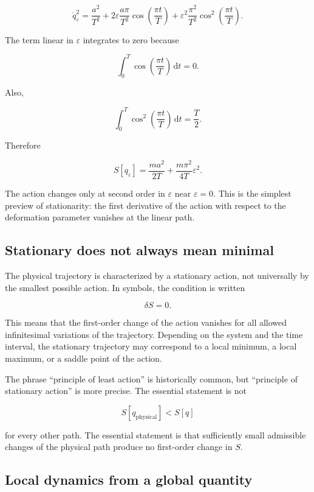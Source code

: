 \[
\dot q_{\varepsilon}^{2}
=
\frac{a^{2}}{T^{2}}
+
2\varepsilon\frac{a\pi}{T^{2}}
\cos\left(\frac{\pi t}{T}\right)
+
\varepsilon^{2}\frac{\pi^{2}}{T^{2}}
\cos^{2}\left(\frac{\pi t}{T}\right).
\]

The term linear in \(\varepsilon\) integrates to zero because

\[
\int_{0}^{T}
\cos\left(\frac{\pi t}{T}\right)
\,\mathrm{d}t
=
0.
\]

Also,

\[
\int_{0}^{T}
\cos^{2}\left(\frac{\pi t}{T}\right)
\,\mathrm{d}t
=
\frac{T}{2}.
\]

Therefore

\[
\boxed{
S[q_{\varepsilon}]
=
\frac{ma^{2}}{2T}
+
\frac{m\pi^{2}}{4T}\varepsilon^{2}
}.
\]

The action changes only at second order in \(\varepsilon\) near \(\varepsilon=0\). This is the simplest preview of stationarity: the first derivative of the action with respect to the deformation parameter vanishes at the linear path.

\subsection{Stationary does not always mean minimal}

The physical trajectory is characterized by a stationary action, not universally by the smallest possible action. In symbols, the condition is written

\[
\delta S=0.
\]

This means that the first-order change of the action vanishes for all allowed infinitesimal variations of the trajectory. Depending on the system and the time interval, the stationary trajectory may correspond to a local minimum, a local maximum, or a saddle point of the action.

The phrase ``principle of least action'' is historically common, but ``principle of stationary action'' is more precise. The essential statement is not

\[
S[q_{\mathrm{physical}}]
<
S[q]
\]

for every other path. The essential statement is that sufficiently small admissible changes of the physical path produce no first-order change in \(S\).

\subsection{Local dynamics from a global quantity}

